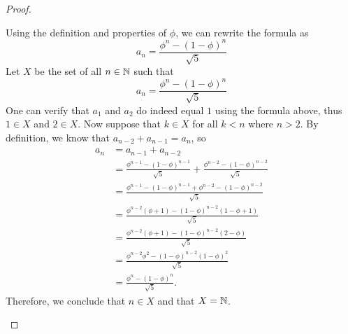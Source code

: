 \begin{proof}
\begin{enumerate}[label=(\alph*)]
Using the definition and properties of \(\phi\), we can rewrite the formula as
\[a_n = \frac{\phi^n - (1-\phi)^n}{\sqrt{5}}\]
Let \(X\) be the set of all \(n \in \mathbb{N}\) such that \[a_n = \frac{\phi^n - (1-\phi)^n}{\sqrt{5}}\]
One can verify that \(a_1\) and \(a_2\) do indeed equal \(1\) using the formula above, thus \(1 \in X\) and \(2 \in X\).
Now suppose that \(k \in X\) for all \(k < n\) where \(n > 2\).
By definition, we know that \(a_{n-2} + a_{n-1} = a_n\), so
\begin{align*}
    a_n &= a_{n-1} + a_{n-2} \\
    &= \frac{\phi^{n-1} - (1-\phi)^{n-1}}{\sqrt{5}} + \frac{\phi^{n-2} - (1-\phi)^{n-2}}{\sqrt{5}}\\
    &= \frac{\phi^{n-1} - (1-\phi)^{n-1} + \phi^{n-2} - (1-\phi)^{n-2}}{\sqrt{5}} \\
    &= \frac{\phi^{n-2}(\phi + 1) - (1-\phi)^{n-2}(1 - \phi + 1)}{\sqrt{5}}\\
    &= \frac{\phi^{n-2}(\phi + 1) - (1-\phi)^{n-2}(2 - \phi)}{\sqrt{5}}\\
    &= \frac{\phi^{n-2}\phi^2 - (1-\phi)^{n-2}(1-\phi)^2}{\sqrt{5}}\\
    &= \frac{\phi^n - (1-\phi)^n}{\sqrt{5}}.
\end{align*}
Therefore, we conclude that \(n \in X\) and that \(X = \mathbb{N}\).
\end{enumerate}
\end{proof}

